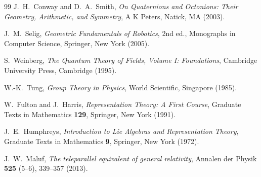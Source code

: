 \documentclass[dvipdfmx,a4paper]{article}
\theoremstyle{definition}
\theoremstyle{plain}
\theoremstyle{remark}
\begin{document}
\begin{thebibliography}{99}
J.~H.~Conway and D.~A.~Smith,
\textit{On Quaternions and Octonions: Their Geometry, Arithmetic, and Symmetry},
A K Peters, Natick, MA (2003).

J.~M.~Selig,
\textit{Geometric Fundamentals of Robotics}, 2nd ed.,
Monographs in Computer Science, Springer, New York (2005).

S.~Weinberg,
\textit{The Quantum Theory of Fields, Volume I: Foundations},
Cambridge University Press, Cambridge (1995).

W.-K.~Tung,
\textit{Group Theory in Physics},
World Scientific, Singapore (1985).

W.~Fulton and J.~Harris,
\textit{Representation Theory: A First Course},
Graduate Texts in Mathematics \textbf{129},
Springer, New York (1991).

J.~E.~Humphreys,
\textit{Introduction to Lie Algebras and Representation Theory},
Graduate Texts in Mathematics \textbf{9},
Springer, New York (1972).

J.~W.~Maluf,
\textit{The teleparallel equivalent of general relativity},
Annalen der Physik \textbf{525} (5--6), 339--357 (2013).

\end{thebibliography}
\end{document}
